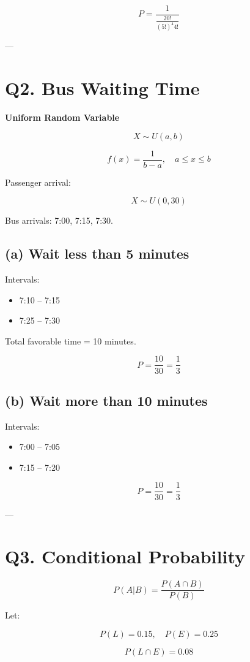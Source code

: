\documentclass[12pt]{article}
\begin{document}
\[
P = \frac{1}{\frac{20!}{(5!)^4 4!}}
\]

---
\newpage
\section*{Q2. Bus Waiting Time}

\textbf{Uniform Random Variable}

\[
X \sim U(a,b)
\]

\[
f(x) = \frac{1}{b-a}, \quad a \le x \le b
\]

Passenger arrival:

\[
X \sim U(0,30)
\]

Bus arrivals: 7:00, 7:15, 7:30.

\subsection*{(a) Wait less than 5 minutes}

Intervals:

\begin{itemize}
\item 7:10 -- 7:15
\item 7:25 -- 7:30
\end{itemize}

Total favorable time = 10 minutes.

\[
P = \frac{10}{30} = \frac{1}{3}
\]

\subsection*{(b) Wait more than 10 minutes}

Intervals:

\begin{itemize}
\item 7:00 -- 7:05
\item 7:15 -- 7:20
\end{itemize}

\[
P = \frac{10}{30} = \frac{1}{3}
\]

---
\newpage
\section*{Q3. Conditional Probability}

\[
P(A|B) = \frac{P(A \cap B)}{P(B)}
\]

Let:

\[
P(L) = 0.15, \quad P(E) = 0.25
\]

\[
P(L \cap E) = 0.08
\]
\end{document}
